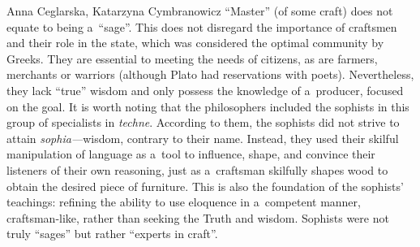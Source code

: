 \begin{artengenv2auth}{Anna Ceglarska, Katarzyna Cymbranowicz}
``Master'' (of some craft) does not equate to being a~``sage''. This does not disregard the importance of craftsmen and their role in the state, which was considered the optimal community by Greeks. They are essential to meeting the needs of citizens, as are farmers, merchants or warriors (although Plato had reservations with poets). Nevertheless, they lack ``true'' wisdom and only possess the knowledge of a~producer, focused on the goal. It is worth noting that the philosophers included the sophists in this group of specialists in \textit{techne}. According to them, the sophists did not strive to attain \textit{sophia---}wisdom, contrary to their name. Instead, they used their skilful manipulation of language as a~tool to influence, shape, and convince their listeners of their own reasoning, just as a~craftsman skilfully shapes wood to obtain the desired piece of furniture. This is also the foundation of the sophists' teachings: refining the ability to use eloquence in a~competent manner, craftsman-like, rather than seeking the Truth and wisdom. Sophists were not truly ``sages'' but rather ``experts in craft''.




\end{artengenv2auth}
